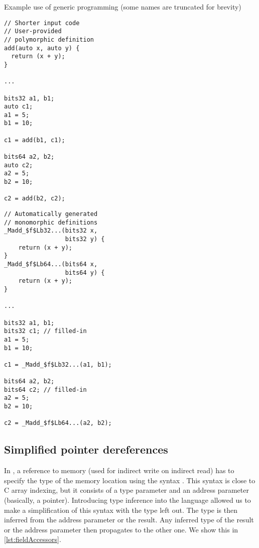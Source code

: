 \begin{codex}
    \caption{Example use of generic programming (some names are truncated for brevity)}
    \label{lst:reduction}
    \begin{center}
    \begin{minipage}{0.5\linewidth}
    \begin{lstlisting}
// Shorter input code
// User-provided
// polymorphic definition
add(auto x, auto y) {
  return (x + y);
}

...

bits32 a1, b1;
auto c1;
a1 = 5;
b1 = 10;

c1 = add(b1, c1);

bits64 a2, b2;
auto c2;
a2 = 5;
b2 = 10;

c2 = add(b2, c2);
    \end{lstlisting}
    \end{minipage}%
    \begin{minipage}{0.5\linewidth}
    \begin{lstlisting}
// Automatically generated
// monomorphic definitions
_Madd_$f$Lb32...(bits32 x,
                 bits32 y) {
    return (x + y);
}
_Madd_$f$Lb64...(bits64 x,
                 bits64 y) {
    return (x + y);
}

...

bits32 a1, b1;
bits32 c1; // filled-in
a1 = 5;
b1 = 10;

c1 = _Madd_$f$Lb32...(a1, b1);

bits64 a2, b2;
bits64 c2; // filled-in
a2 = 5;
b2 = 10;

c2 = _Madd_$f$Lb64...(a2, b2);
    \end{lstlisting}
    \end{minipage}
    \end{center}
\end{codex}

\subsection{Simplified pointer dereferences}

In \cmm, a reference to memory (used for indirect write on indirect read) has to specify the type of the memory location using the syntax . This syntax is close to C array indexing, but it consists of a type parameter and an address parameter (basically, a pointer). Introducing type inference into the language allowed us to make a simplification of this syntax with the type left out. The type is then inferred from the address parameter or the result. Any inferred type of the result or the address parameter then propagates to the other one. We show this in \cref{lst:fieldAccessors}.

